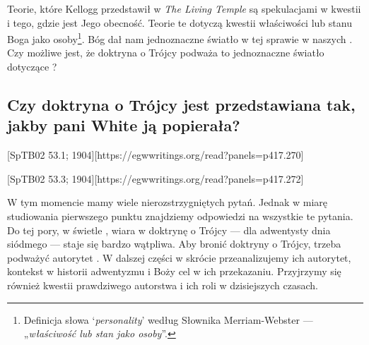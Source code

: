 Teorie, które Kellogg przedstawił w \textit{The Living Temple} są spekulacjami w kwestii  i tego, gdzie jest Jego obecność. Teorie te dotyczą kwestii właściwości lub stanu Boga jako osoby\footnote{Definicja słowa ‘\textit{personality}’ według Słownika Merriam-Webster — „\textit{właściwość lub stan jako osoby}”.}. Bóg dał nam jednoznaczne światło w tej sprawie w naszych . Czy możliwe jest, że doktryna o Trójcy podważa to jednoznaczne światło dotyczące ?

\subsection*{Czy doktryna o Trójcy jest przedstawiana tak, jakby pani White ją popierała?}

[SpTB02 53.1; 1904][https://egwwritings.org/read?panels=p417.270]

[SpTB02 53.3; 1904][https://egwwritings.org/read?panels=p417.272]

W tym momencie mamy wiele nierozstrzygniętych pytań. Jednak w miarę studiowania pierwszego punktu  znajdziemy odpowiedzi na wszystkie te pytania. Do tej pory, w świetle , wiara w doktrynę o Trójcy — dla adwentysty dnia siódmego — staje się bardzo wątpliwa. Aby bronić doktryny o Trójcy, trzeba podważyć autorytet . W dalszej części w skrócie przeanalizujemy ich autorytet, kontekst w historii adwentyzmu i Boży cel w ich przekazaniu. Przyjrzymy się również kwestii prawdziwego autorstwa  i ich roli w dzisiejszych czasach.


